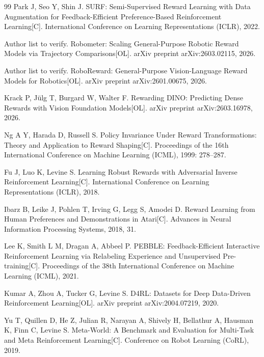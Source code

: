 \begin{thebibliography}{99}
    Park J, Seo Y, Shin J.
    SURF: Semi-Supervised Reward Learning with Data Augmentation for Feedback-Efficient Preference-Based Reinforcement Learning[C].
    International Conference on Learning Representations (ICLR), 2022.
    
    Author list to verify.
    Robometer: Scaling General-Purpose Robotic Reward Models via Trajectory Comparisons[OL].
    arXiv preprint arXiv:2603.02115, 2026.
    
    Author list to verify.
    RoboReward: General-Purpose Vision-Language Reward Models for Robotics[OL].
    arXiv preprint arXiv:2601.00675, 2026.
    
    Krack P, Jülg T, Burgard W, Walter F.
    Rewarding DINO: Predicting Dense Rewards with Vision Foundation Models[OL].
    arXiv preprint arXiv:2603.16978, 2026.
    
    Ng A Y, Harada D, Russell S.
    Policy Invariance Under Reward Transformations: Theory and Application to Reward Shaping[C].
    Proceedings of the 16th International Conference on Machine Learning (ICML), 1999: 278--287.
    
    Fu J, Luo K, Levine S.
    Learning Robust Rewards with Adversarial Inverse Reinforcement Learning[C].
    International Conference on Learning Representations (ICLR), 2018.
    
    Ibarz B, Leike J, Pohlen T, Irving G, Legg S, Amodei D.
    Reward Learning from Human Preferences and Demonstrations in Atari[C].
    Advances in Neural Information Processing Systems, 2018, 31.
    
    Lee K, Smith L M, Dragan A, Abbeel P.
    PEBBLE: Feedback-Efficient Interactive Reinforcement Learning via Relabeling Experience and Unsupervised Pre-training[C].
    Proceedings of the 38th International Conference on Machine Learning (ICML), 2021.
    
    Kumar A, Zhou A, Tucker G, Levine S.
    D4RL: Datasets for Deep Data-Driven Reinforcement Learning[OL].
    arXiv preprint arXiv:2004.07219, 2020.
    
    Yu T, Quillen D, He Z, Julian R, Narayan A, Shively H, Bellathur A, Hausman K, Finn C, Levine S.
    Meta-World: A Benchmark and Evaluation for Multi-Task and Meta Reinforcement Learning[C].
    Conference on Robot Learning (CoRL), 2019.
    

\end{thebibliography}

